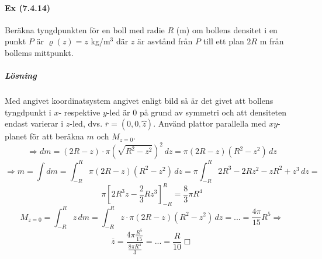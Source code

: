 \paragraph*{Ex (7.4.14)} Beräkna tyngdpunkten för en boll med radie $R$ (m) om bollens densitet i en punkt $P$ är $\varrho(z)=z$ kg/m$^3$ där $z$ är asvtånd från $P$ till ett plan $2R$ m från bollems mittpunkt.
\subparagraph{Lösning}
Med angivet koordinatsystem angivet enligt bild så är det givet att bollens tyngdpunkt i $x$- respektive $y$-led är $0$ på grund av symmetri och att densiteten endast varierar i $z$-led, dvs. $\overline{r}=(0,0,\overbrace{z})$.
Använd plattor parallella med  $xy$-planet för att beräkna $m$ och $M_{z=0}$.\\
\begin{equation*}
    \Rightarrow dm=
    (2R-z)\cdot\pi(\sqrt{R^2-z^2})^2\, dz=
    \pi(2R-z)(R^2-z^2)\, dz
\end{equation*}
\begin{equation*}
    \Rightarrow m=
    \int dm=
    \int_{-R}^R\pi(2R-z)(R^2-z^2)\, dz=
    \pi\int_{-R}^R 2R^3-2Rz^2-zR^2+z^3\, dz=
\end{equation*}
\begin{equation*}
    \pi[2R^3z-\frac{2}{3}Rz^3]_{-R}^R=
    \frac{8}{3}\pi R^4
\end{equation*}
\begin{equation*}
    M_{z=0}=\int_{-R}^R z\, dm=
    \int_{-R}^R z\cdot\pi(2R-z)(R^2-z^2)\, dz=
    ...=
    \frac{4\pi}{15}R^5\Rightarrow
\end{equation*}
\begin{equation*}
    \overline{z}=\frac{4\pi\frac{R^5}{15}}{\frac{8\pi R^4}{3}}=
    ...=
    \frac{R}{10}\Box
\end{equation*}

